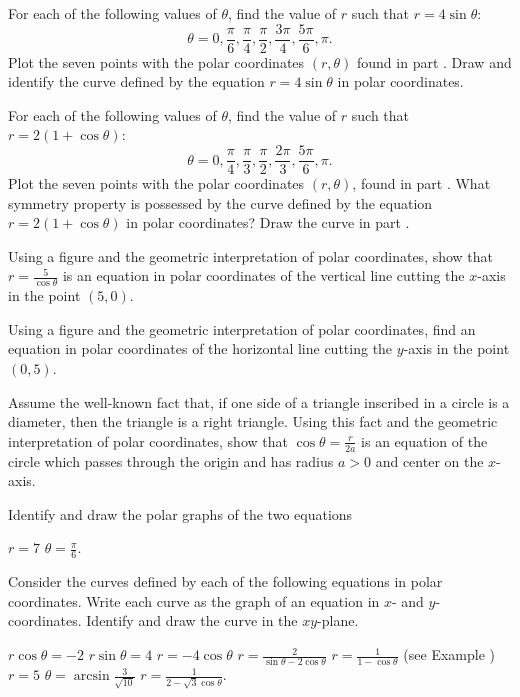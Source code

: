 \begin{exercises}

\begin{exenum}
\x
{}
For each of the following values of $\theta$, find
the value of $r$ such that $r=4 \sin \theta$:
\[
\theta = 0, \frac\pi6, \frac\pi4, \frac\pi2,
\frac{3\pi}4, \frac{5\pi}6, \pi
.
\]
\x
Plot the seven points with the polar coordinates
$(r,\theta)$ found in part .
\x
Draw and identify the curve defined by the equation
$r=4\sin\theta$ in polar coordinates.
\end{exenum}

\begin{exenum}
\x
{}
For each of the following values of $\theta$,
find the value of $r$ such that
$r = 2(1+\cos \theta)$:
\[
\theta = 0, \frac\pi4, \frac\pi3, \frac\pi2, \frac{2\pi}3,
\frac{5\pi}6, \pi
.
\]
\x
Plot the seven points with the polar coordinates
$(r,\theta)$, found in part .
\x
{}
What symmetry property is possessed by the
curve defined by the equation
$r=2(1+\cos\theta)$ in polar coordinates?
\x
Draw the curve in part .
\end{exenum}

Using a figure and the geometric interpretation
of polar coordinates, show that
$r = \frac5{\cos\theta}$ is an equation in polar
coordinates of the vertical line cutting the
$x$-axis in the point $(5,0)$.

Using a figure and the geometric interpretation
of polar coordinates, find an equation in polar
coordinates of the horizontal line cutting
the $y$-axis in the point $(0,5)$.

Assume the well-known fact that,
if one side of a triangle inscribed in a circle
is a diameter, then the triangle is a right triangle.
Using this fact and the geometric interpretation
of polar coordinates, show that
$\cos\theta = \frac{r}{2a}$ is an equation
of the circle which passes through the origin
and has radius $a>0$ and center on
the $x$-axis.

Identify and draw the polar graphs of
the two equations
\begin{exenum}
\x
$r=7$
\x
$\theta = \frac\pi6$.
\end{exenum}

Consider the curves defined by each of the following
equations in polar coordinates.
Write each curve as the graph of an equation
in $x$- and $y$-coordinates.
Identify and draw the curve in the $xy$-plane.
\begin{exenum}
\x
$r\cos\theta = -2$
\x
$r\sin\theta = 4$
\x
$r=-4\cos\theta$
\x
$r=\frac2{\sin\theta-2\cos\theta}$
\x
$r=\frac1{1-\cos\theta}$ (see Example )
\x
$r=5$
\x
$\theta = \arcsin \frac3{\sqrt{10}}$
\x
$r = \frac1{2-\sqrt3 \cos\theta}$.
\end{exenum}


\end{exercises}
